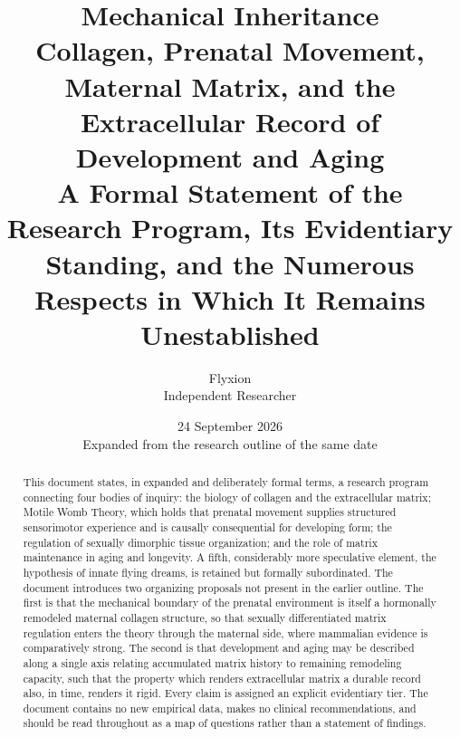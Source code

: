 \documentclass[11pt,a4paper]{article}
\title{\textbf{Mechanical Inheritance}\\[0.4em]
\large Collagen, Prenatal Movement, Maternal Matrix, and the Extracellular Record of Development and Aging\\[0.3em]
\normalsize A Formal Statement of the Research Program, Its Evidentiary Standing, and the Numerous Respects in Which It Remains Unestablished}
\author{Flyxion\\ \small Independent Researcher}
\date{24 September 2026\\ \small Expanded from the research outline of the same date}
\theoremstyle{plain}
\theoremstyle{definition}
\theoremstyle{remark}
\begin{document}
\maketitle

\begin{abstract}
\noindent
This document states, in expanded and deliberately formal terms, a research program connecting four bodies of inquiry: the biology of collagen and the extracellular matrix; Motile Womb Theory, which holds that prenatal movement supplies structured sensorimotor experience and is causally consequential for developing form; the regulation of sexually dimorphic tissue organization; and the role of matrix maintenance in aging and longevity. A fifth, considerably more speculative element, the hypothesis of innate flying dreams, is retained but formally subordinated. The document introduces two organizing proposals not present in the earlier outline. The first is that the mechanical boundary of the prenatal environment is itself a hormonally remodeled maternal collagen structure, so that sexually differentiated matrix regulation enters the theory through the maternal side, where mammalian evidence is comparatively strong. The second is that development and aging may be described along a single axis relating accumulated matrix history to remaining remodeling capacity, such that the property which renders extracellular matrix a durable record also, in time, renders it rigid. Every claim is assigned an explicit evidentiary tier. The document contains no new empirical data, makes no clinical recommendations, and should be read throughout as a map of questions rather than a statement of findings.
\end{abstract}
\end{document}
